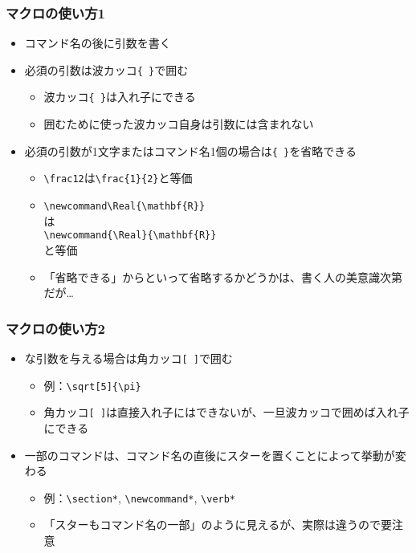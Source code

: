 \documentclass[aspectratio=169]{beamer}
\newcommand\cmdname[1]{\texttt{\textbackslash #1}}
\begin{document}
\begin{frame}[fragile]\frametitle{マクロの使い方1}
  \begin{itemize}
  \item コマンド名の後に引数を書く
  \item 必須の引数は波カッコ\lstinline!{ }!で囲む
    \begin{itemize}
    \item 波カッコ\lstinline!{ }!は入れ子にできる
    \item 囲むために使った波カッコ自身は引数には含まれない
    \end{itemize}
  \item 必須の引数が1文字またはコマンド名1個の場合は\lstinline!{ }!を省略できる
    \begin{itemize}
    \item \lstinline!\frac12!は\lstinline!\frac{1}{2}!と等価
    \item \lstinline!\newcommand\Real{\mathbf{R}}!\\
      は\\
      \lstinline!\newcommand{\Real}{\mathbf{R}}!\\
      と等価
    \item 「省略できる」からといって省略するかどうかは、書く人の美意識次第だが…
    \end{itemize}
  \end{itemize}
\end{frame}
\begin{frame}[fragile]\frametitle{マクロの使い方2}
  \begin{itemize}\item {}な引数を与える場合は角カッコ\lstinline![ ]!で囲む
    \begin{itemize}
    \item 例：\lstinline!\sqrt[5]{\pi}!
    \item 角カッコ\lstinline![ ]!は直接入れ子にはできないが、一旦波カッコで囲めば入れ子にできる
    \end{itemize}
  \item 一部のコマンドは、コマンド名の直後にスターを置くことによって挙動が変わる
    \begin{itemize}
    \item 例：\cmdname{section*}, \cmdname{newcommand*}, \cmdname{verb*}
    \item 「スターもコマンド名の一部」のように見えるが、実際は違うので要注意
    \end{itemize}
  \end{itemize}
\end{frame}
\end{document}
